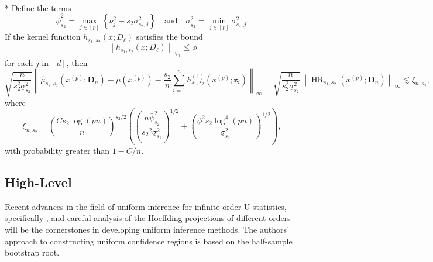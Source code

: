 \begin{boxD}
	\begin{thm}\label{thm:rit4_2}\mbox{}\\*
		Define the terms
		\begin{equation}
			\bar{\psi}_{s_2}^2
			= \max_{j \in[p]}\left\{\nu_j^2- s_2 \sigma_{s_2, j}^2\right\}
			\quad \text {and} \quad
			\underline{\sigma}_{s_2}^2
			= \min_{j \in[p]} \sigma_{s_2, j}^2.
		\end{equation}
		If the kernel function $h_{s_1, s_2}\left(x ; D_{\ell}\right)$ satisfies the bound
		\begin{equation}
			\left\|h_{s_1, s_2}\left(x ; D_{\ell}\right)\right\|_{\psi_1} \leq \phi
		\end{equation}
		for each $j$ in $[d]$, then
		\begin{equation}
			\sqrt{\frac{n}{s_2^2 \underline{\sigma}_{s_2}^2}}
			\left\|\hat{\mu}_{s_1, s_2}(x^{(p)}; \mathbf{D}_n) - \mu(x^{(p)}) - \frac{s_2}{n} \sum_{i=1}^n h^{(1)}_{s_1, s_2}(x^{(p)}; \mathbf{z}_{i})\right\|_{\infty}
			= \sqrt{\frac{n}{s_2^2 \underline{\sigma}_{s_2}^2}} \left\|\operatorname{HR}_{s_1, s_2}(x^{(p)}; \mathbf{D}_n)\right\|_{\infty}
			\lesssim \xi_{n, s_2},
		\end{equation}
		where
		\begin{equation}
			\xi_{n, s_2}
			= \left(\frac{C s_2 \log(p n)}{n}\right)^{s_2 / 2}\left(\left(\frac{n \bar{\psi}_{s_2}^2}{{s_2}^2 \underline{\sigma}_{s_2}^2}\right)^{1 / 2}+\left(\frac{\phi^2 s_2 \log ^4(p n)}{\underline{\sigma}_{s_2}^2}\right)^{1 / 2}\right),
		\end{equation}
		with probability greater than $1-C / n$.
	\end{thm}
\end{boxD}

\subsection{High-Level}
Recent advances in the field of uniform inference for infinite-order U-statistics, specifically \citet{ritzwoller_uniform_2024}, and careful analysis of the Hoeffding projections of different orders will be the cornerstones in developing uniform inference methods.
The authors' approach to constructing uniform confidence regions is based on the half-sample bootstrap root.


